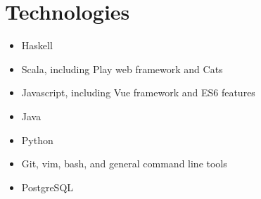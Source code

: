 \documentclass[10pt]{article}
\begin{document}
\section*{Technologies}
\begin{multicols}{2}
\begin{itemize}
    \itemsep0em 
    \item Haskell
    \item Scala, including Play web framework and Cats
    \item Javascript, including Vue framework and ES6 features
    \item Java
    \item Python
    \item Git, vim, bash, and general command line tools
    \item PostgreSQL
\end{itemize}
\end{multicols}
\end{document}
